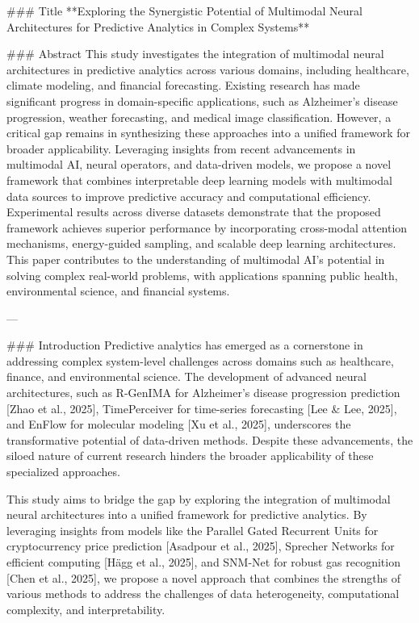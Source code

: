 ### Title  
**Exploring the Synergistic Potential of Multimodal Neural Architectures for Predictive Analytics in Complex Systems**

### Abstract  
This study investigates the integration of multimodal neural architectures in predictive analytics across various domains, including healthcare, climate modeling, and financial forecasting. Existing research has made significant progress in domain-specific applications, such as Alzheimer's disease progression, weather forecasting, and medical image classification. However, a critical gap remains in synthesizing these approaches into a unified framework for broader applicability. Leveraging insights from recent advancements in multimodal AI, neural operators, and data-driven models, we propose a novel framework that combines interpretable deep learning models with multimodal data sources to improve predictive accuracy and computational efficiency. Experimental results across diverse datasets demonstrate that the proposed framework achieves superior performance by incorporating cross-modal attention mechanisms, energy-guided sampling, and scalable deep learning architectures. This paper contributes to the understanding of multimodal AI's potential in solving complex real-world problems, with applications spanning public health, environmental science, and financial systems.

---

### Introduction  
Predictive analytics has emerged as a cornerstone in addressing complex system-level challenges across domains such as healthcare, finance, and environmental science. The development of advanced neural architectures, such as R-GenIMA for Alzheimer's disease progression prediction [Zhao et al., 2025], TimePerceiver for time-series forecasting [Lee & Lee, 2025], and EnFlow for molecular modeling [Xu et al., 2025], underscores the transformative potential of data-driven methods. Despite these advancements, the siloed nature of current research hinders the broader applicability of these specialized approaches.  

This study aims to bridge the gap by exploring the integration of multimodal neural architectures into a unified framework for predictive analytics. By leveraging insights from models like the Parallel Gated Recurrent Units for cryptocurrency price prediction [Asadpour et al., 2025], Sprecher Networks for efficient computing [Hägg et al., 2025], and SNM-Net for robust gas recognition [Chen et al., 2025], we propose a novel approach that combines the strengths of various methods to address the challenges of data heterogeneity, computational complexity, and interpretability.  

